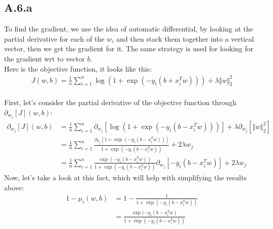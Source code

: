 \documentclass[]{article}
\begin{document}
    \subsection*{A.6.a}
        To find the gradient, we use the idea of automatic differential, by looking at the partial derivative for each of the $w_i$ and then stack them together into a vertical vector, then we get the gradient for it. The same strategy is used for looking for the gradient wrt to vector $b$. 
        \\
        Here is the objective function, it looks like this: 
        \begin{align*}\tag{A.6.a.1}\label{eqn:A.6.a.1}
            J(w, b) = \frac{1}{n}\sum_{i = 1}^{n}
                \log(1 + \exp(-y_i(b + x^T_iw))) 
                +
                \lambda \Vert w\Vert_2^2
        \end{align*}
        \\
        First, let's consider the partial derivative of the objective function through $\partial_{w_j}[J](w, b)$: 
        \begin{align*}\tag{A.6.a.2}\label{eqn:A.6.a.2}
            \partial_{w_j}[J](w, b) 
            &=
            \frac{1}{n}\sum_{i  = 1}^{n}
            \partial_{w_j}\left[
                    \log \left(
                        1 + \exp(-y_i(b - x_i^T w))
                    \right)
                \right]
            + \lambda\partial_{w_j}[\Vert w\Vert_2^2]
            \\
            &= 
            \frac{1}{n}\sum_{i  = 1}^{n}
                \frac{
                    \partial_{w_j}[1 + \exp(-y_i(b - x_i^T w))]
                }
                {
                    1 + \exp(-y_i(b - x_i^T w))
                }
                +
                2\lambda w_j
            \\
            &= 
            \frac{1}{n}\sum_{i  = 1}^{n}
                \frac{
                    \exp(-y_i(b - x_i^T w))
                }
                {
                    1 + \exp(-y_i(b - x_i^T w))
                }\partial_{w_j}[-y_i(b - x_i^Tw)]
                + 2\lambda w_j
        \end{align*}
        Now, let's take a look at this fact, which will help with simplifying the results above: 
        \begin{align*}\tag{A.6.a.3}\label{eqn:A.6.a.3}
            1 - \mu_i(w, b) &= 
            1 - \frac{1}{1 + \exp(-y_i(b - x_i^T w))}
            \\
            &= 
            \frac{\exp(-y_i(b - x_i^T w)}{1 + \exp(-y_i(b - x_i^T w))}
        \end{align*}
\end{document}
